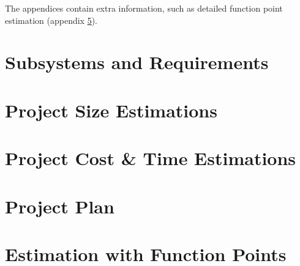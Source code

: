 \documentclass[11pt]{report}
\begin{document}
The appendices contain extra information, such as detailed function point estimation (appendix \ref{chapFunctionPoints}).

\chapter{Subsystems and Requirements}
\label{chapSubsystems}



\chapter{Project Size Estimations}
\label{chapProjectSizeEstimations}


\chapter{Project Cost \& Time Estimations}
\label{chapProjectCostTimeEstimationes}


\chapter{Project Plan}
\label{chapPlan}

\appendix

\chapter{Estimation with Function Points}
\label{chapFunctionPoints}

\end{document}
